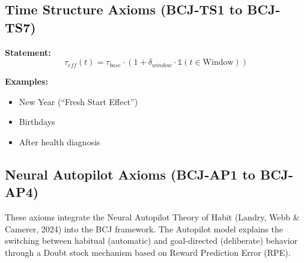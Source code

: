 \subsection{Time Structure Axioms (BCJ-TS1 to BCJ-TS7)}

\begin{tcolorbox}[colback=gray!5!white, colframe=gray!75!black,
    title=Axiom BCJ-TS5: Critical Time Windows]
\textbf{Statement:}
\begin{equation}
\tau_{eff}(t) = \tau_{base} \cdot (1 + \delta_{window} \cdot \mathbb{1}(t \in \text{Window}))
\end{equation}

\textbf{Examples:}
\begin{itemize}[nosep]
\item New Year (``Fresh Start Effect'')
\item Birthdays
\item After health diagnosis
\end{itemize}
\end{tcolorbox}

\subsection{Neural Autopilot Axioms (BCJ-AP1 to BCJ-AP4)}
\label{sec:bcj-autopilot}

These axioms integrate the Neural Autopilot Theory of Habit (Landry, Webb \& Camerer, 2024) into the BCJ framework. The Autopilot model explains the switching between habitual (automatic) and goal-directed (deliberate) behavior through a Doubt stock mechanism based on Reward Prediction Error (RPE).

